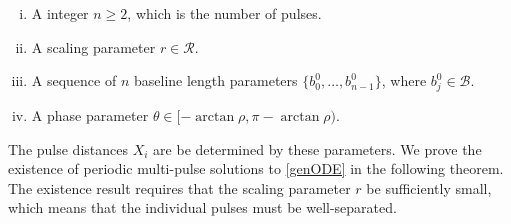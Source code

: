 \documentclass[thesis.tex]{subfiles}
\begin{document}
\begin{enumerate}[(i)]
\item A integer $n \geq 2$, which is the number of pulses.
\item A scaling parameter $r \in \mathcal{R}$.
\item A sequence of $n$ baseline length parameters $\{ b_0^0, \dots, b_{n-1}^0 \}$, where $b_j^0 \in \mathcal{B}$.
\item A phase parameter $\theta \in [-\arctan \rho, \pi - \arctan \rho)$.
\end{enumerate}
The pulse distances $X_i$ are be determined by these parameters. We prove the existence of periodic multi-pulse solutions to \eqref{genODE} in the following theorem. The existence result requires that the scaling parameter $r$ be sufficiently small, which means that the individual pulses must be well-separated.
\end{document}
